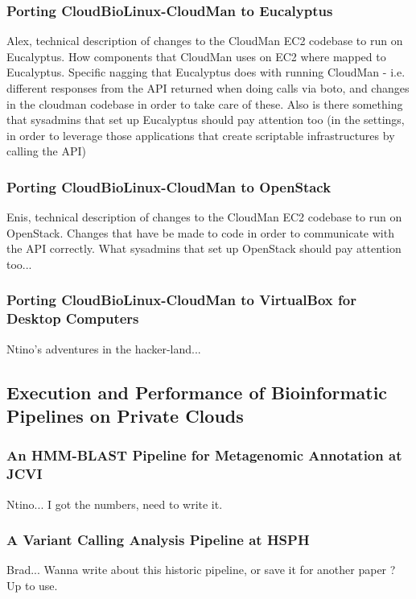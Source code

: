 \documentclass[10pt]{bmc_article}
\newenvironment{bmcformat}{\baselineskip20pt\sloppy\setboolean{publ}{false}}{\baselineskip20pt\sloppy}
\begin{document}
\begin{bmcformat}
\subsubsection*{Porting CloudBioLinux-CloudMan to Eucalyptus}
Alex, technical description of changes to the CloudMan EC2 codebase to run on Eucalyptus. How components that
CloudMan uses on EC2 where mapped to Eucalyptus. Specific nagging that Eucalyptus does with running CloudMan -
i.e. different responses from the API returned when doing calls via boto, and changes in the cloudman codebase in
order to take care of these. Also is there something that sysadmins that set up Eucalyptus should pay attention too 
(in the settings, in order to leverage those applications that create scriptable infrastructures by calling the API) \pb

\subsubsection*{Porting CloudBioLinux-CloudMan to OpenStack}
Enis, technical description of changes to the CloudMan EC2 codebase to run on OpenStack.  Changes that have be
made to code in order to communicate with the API correctly. What sysadmins that set up OpenStack should pay attention 
too... \pb

\subsubsection*{Porting CloudBioLinux-CloudMan to VirtualBox for Desktop Computers}
Ntino's adventures in the hacker-land... \pb

\subsection*{Execution and Performance of Bioinformatic Pipelines on Private Clouds} 

\subsubsection*{An HMM-BLAST Pipeline for Metagenomic Annotation at JCVI}
Ntino... I got the numbers, need to write it. \pb

\subsubsection*{A Variant Calling Analysis Pipeline at HSPH}
Brad... Wanna write about this historic pipeline, or save it for another paper ? Up to use.\pb


\end{bmcformat}
\end{document}
